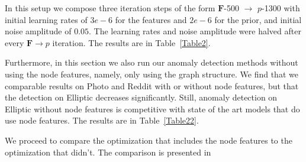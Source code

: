 \documentclass[letterpaper]{article} %
\newcommand{\ron}[1]{{{\textcolor{red}{\textbf{[Ron:} {#1}\textbf{]}}}}}
\begin{document}
In this setup we compose three iteration steps of the form $\mathbf{F}$-500 $\rightarrow$ $p$-1300 with initial learning rates of $3e-6$ for the features and $2e-6$ for the prior, and initial noise amplitude of $0.05$. The learning rates and noise amplitude were halved after every $\mathbf{F} \rightarrow p$ iteration.  The results are in Table~\ref{Table2}.

Furthermore, in this section we also run our anomaly detection methods without using the node features, namely, only using the graph structure. We find that we comparable results on Photo and Reddit with or without node features, but that the detection on Elliptic decreases significantly. Still, anomaly detection on Elliptic without node features is competitive with state of the art models that do use node features.  The results are in Table~\ref{Table22}.






We proceed to compare the optimization that includes the node features to the optimization that didn't. The comparison is presented in 
\end{document}

